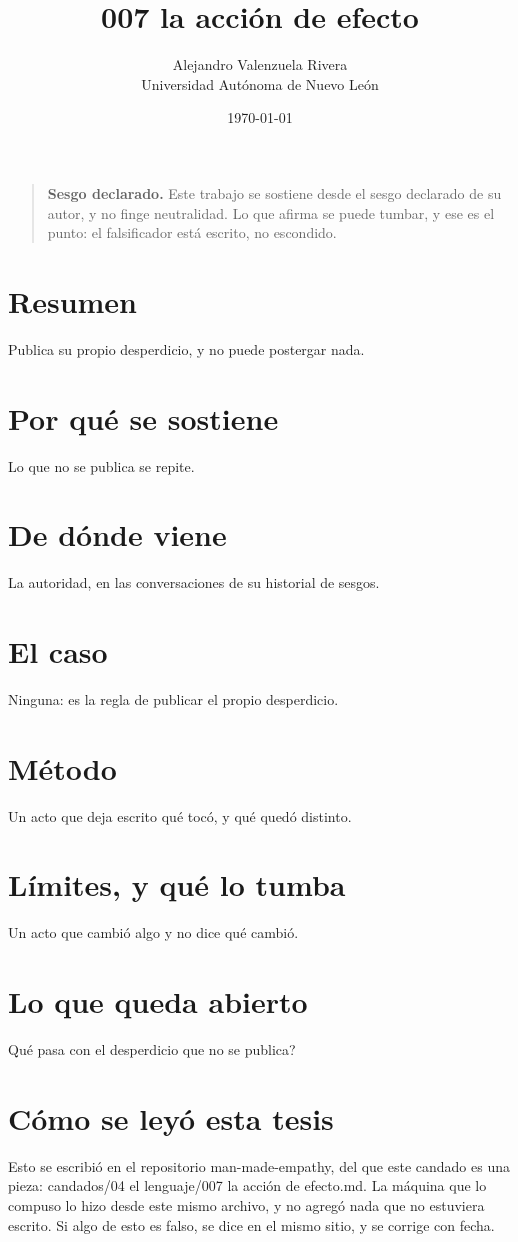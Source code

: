 \documentclass[11pt,a4paper]{article}
\title{007 la acción de efecto}
\author{Alejandro Valenzuela Rivera\\\small Universidad Autónoma de Nuevo León}
\date{\today}
\begin{document}
\maketitle

\begin{quote}
\textbf{Sesgo declarado.} Este trabajo se sostiene desde el sesgo declarado de su autor, y no finge neutralidad. Lo que afirma se puede tumbar, y ese es el punto: el falsificador está escrito, no escondido.
\end{quote}

\section*{Resumen}
Publica su propio desperdicio, y no puede postergar nada.

\section{Por qué se sostiene}
Lo que no se publica se repite.

\section{De dónde viene}
La autoridad, en las conversaciones de su historial de sesgos.

\section{El caso}
Ninguna: es la regla de publicar el propio desperdicio.

\section{Método}
Un acto que deja escrito qué tocó, y qué quedó distinto.

\section{Límites, y qué lo tumba}
Un acto que cambió algo y no dice qué cambió.

\section{Lo que queda abierto}
\textquestiondown{}Qué pasa con el desperdicio que no se publica?

\section*{Cómo se leyó esta tesis}
Esto se escribió en el repositorio man-made-empathy, del que este candado es una pieza: candados/04 el lenguaje/007 la acción de efecto.md. La máquina que lo compuso lo hizo desde este mismo archivo, y no agregó nada que no estuviera escrito. Si algo de esto es falso, se dice en el mismo sitio, y se corrige con fecha.
\end{document}

